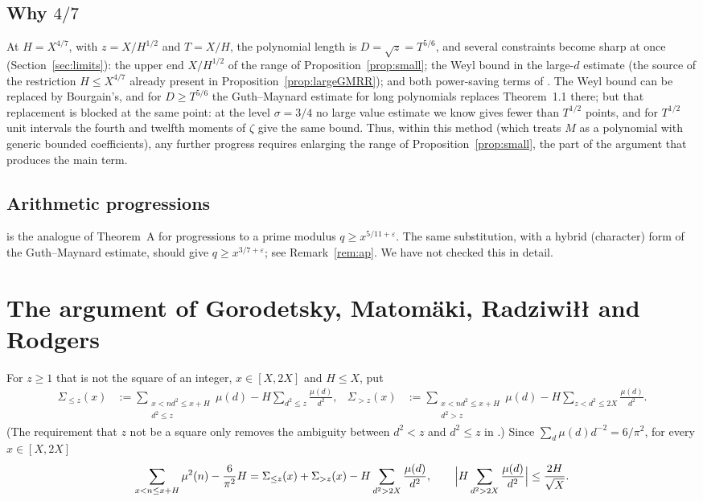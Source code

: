 \documentclass[11pt]{amsart}
\theoremstyle{remark}
\newcommand{\eps}{\varepsilon}
\begin{document}
\subsection*{Why $4/7$}
At $H=X^{4/7}$, with $z=X/H^{1/2}$ and $T=X/H$, the polynomial length is
$D=\sqrt z=T^{5/6}$, and several constraints become sharp at once
(Section~\ref{sec:limits}): the upper end $X/H^{1/2}$ of the range of
Proposition~\ref{prop:small}; the Weyl bound in the large-$d$ estimate (the source of
the restriction $H\le X^{4/7}$ already present in
Proposition~\ref{prop:largeGMRR}); and both power-saving terms of
\cite[Theorem~1.1]{GM}.  The Weyl bound can be replaced by Bourgain's, and for
$D\ge T^{5/6}$ the Guth--Maynard estimate for long polynomials
\cite[Proposition~12.1]{GM} replaces Theorem~1.1 there; but that replacement is
blocked at the same point: at the level $\sigma=3/4$ no large value estimate we
know gives fewer than $T^{1/2}$ points, and for $T^{1/2}$ unit intervals the
fourth and twelfth moments of $\zeta$ give the same bound.  Thus, within this
method (which treats $M$ as a polynomial with generic bounded coefficients), any
further progress requires enlarging the range of Proposition~\ref{prop:small},
the part of the argument that produces the main term.

\subsection*{Arithmetic progressions}
\cite[Theorem~2]{GMRR} is the analogue of Theorem~A for progressions to a prime
modulus $q\ge x^{5/11+\eps}$.  The same substitution, with a hybrid
(character) form of the Guth--Maynard estimate, should give
$q\ge x^{3/7+\eps}$; see Remark~\ref{rem:ap}.  We have not checked this in
detail.

\section{The argument of Gorodetsky, Matom\"aki, Radziwi\l{}\l{} and Rodgers}

For $z\ge 1$ that is not the square of an integer, $x\in[X,2X]$ and $H\le X$, put
\begin{align*}
  \Sigma_{\le z}(x)&:=\sum_{\substack{x<nd^2\le x+H\\ d^2\le z}}\mu(d)-H\sum_{d^2\le z}\frac{\mu(d)}{d^2},&
  \Sigma_{> z}(x)&:=\sum_{\substack{x<nd^2\le x+H\\ d^2> z}}\mu(d)-H\sum_{z<d^2\le 2X}\frac{\mu(d)}{d^2}.
\end{align*}
(The requirement that $z$ not be a square only removes the ambiguity between
$d^2<z$ and $d^2\le z$ in \cite{GMRR}.)  Since $\sum_{d}\mu(d)d^{-2}=6/\pi^2$, for
every $x\in[X,2X]$
\begin{equation}\label{eq:split}
  \sum_{x<n\le x+H}\mu^2(n)-\frac{6}{\pi^2}H
  =\Sigma_{\le z}(x)+\Sigma_{>z}(x)-H\sum_{d^2>2X}\frac{\mu(d)}{d^2},
  \qquad \Bigl|H\sum_{d^2>2X}\frac{\mu(d)}{d^2}\Bigr|\le\frac{2H}{\sqrt{X}}.
\end{equation}
\end{document}
